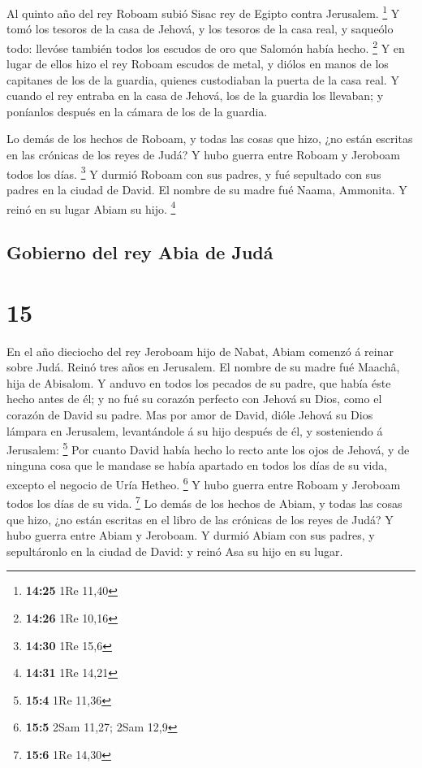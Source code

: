  Al quinto año del rey Roboam subió Sisac rey de Egipto
contra Jerusalem. \footnote{\textbf{14:25} 1Re 11,40}  Y
tomó los tesoros de la casa de Jehová, y los tesoros de la casa real, y
saqueólo todo: llevóse también todos los escudos de oro que Salomón
había hecho. \footnote{\textbf{14:26} 1Re 10,16}  Y en
lugar de ellos hizo el rey Roboam escudos de metal, y diólos en manos de
los capitanes de los de la guardia, quienes custodiaban la puerta de la
casa real.  Y cuando el rey entraba en la casa de Jehová,
los de la guardia los llevaban; y poníanlos después en la cámara de los
de la guardia.

 Lo demás de los hechos de Roboam, y todas las cosas que
hizo, ¿no están escritas en las crónicas de los reyes de Judá?
 Y hubo guerra entre Roboam y Jeroboam todos los días.
\footnote{\textbf{14:30} 1Re 15,6}  Y durmió Roboam con
sus padres, y fué sepultado con sus padres en la ciudad de David. El
nombre de su madre fué Naama, Ammonita. Y reinó en su lugar Abiam su
hijo. \footnote{\textbf{14:31} 1Re 14,21}

\hypertarget{gobierno-del-rey-abia-de-juduxe1}{%
\subsection{Gobierno del rey Abia de
Judá}\label{gobierno-del-rey-abia-de-juduxe1}}

\hypertarget{section-14}{%
\section{15}\label{section-14}}

 En el año dieciocho del rey Jeroboam hijo de Nabat, Abiam
comenzó á reinar sobre Judá.  Reinó tres años en
Jerusalem. El nombre de su madre fué Maachâ, hija de Abisalom.
 Y anduvo en todos los pecados de su padre, que había éste
hecho antes de él; y no fué su corazón perfecto con Jehová su Dios, como
el corazón de David su padre.  Mas por amor de David,
dióle Jehová su Dios lámpara en Jerusalem, levantándole á su hijo
después de él, y sosteniendo á Jerusalem: \footnote{\textbf{15:4} 1Re
  11,36}  Por cuanto David había hecho lo recto ante los
ojos de Jehová, y de ninguna cosa que le mandase se había apartado en
todos los días de su vida, excepto el negocio de Uría Hetheo.
\footnote{\textbf{15:5} 2Sam 11,27; 2Sam 12,9}  Y hubo
guerra entre Roboam y Jeroboam todos los días de su vida. \footnote{\textbf{15:6}
  1Re 14,30}  Lo demás de los hechos de Abiam, y todas las
cosas que hizo, ¿no están escritas en el libro de las crónicas de los
reyes de Judá? Y hubo guerra entre Abiam y Jeroboam.  Y
durmió Abiam con sus padres, y sepultáronlo en la ciudad de David: y
reinó Asa su hijo en su lugar.

